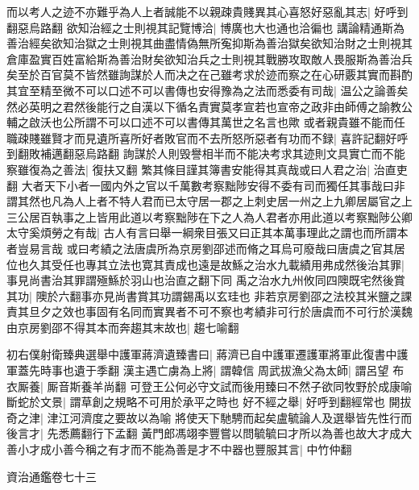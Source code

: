 而以考人之迹不亦難乎為人上者誠能不以親疎貴賤異其心喜怒好惡亂其志|{
	好呼到翻惡烏路翻}
欲知治經之士則視其記覽博洽|{
	博廣也大也通也洽徧也}
講論精通斯為善治經矣欲知治獄之士則視其曲盡情偽無所寃抑斯為善治獄矣欲知治財之士則視其倉庫盈實百姓富給斯為善治財矣欲知治兵之士則視其戰勝攻取敵人畏服斯為善治兵矣至於百官莫不皆然雖詢謀於人而决之在己雖考求於迹而察之在心研覈其實而斟酌其宜至精至微不可以口述不可以書傳也安得豫為之法而悉委有司哉|{
	温公之論善矣然必英明之君然後能行之自漢以下循名責實莫孝宣若也宣帝之政非由師傅之諭教公輔之啟沃也公所謂不可以口述不可以書傳其萬世之名言也歟}
或者親貴雖不能而任職疎賤雖賢才而見遺所喜所好者敗官而不去所怒所惡者有功而不録|{
	喜許記翻好呼到翻敗補邁翻惡烏路翻}
詢謀於人則毁譽相半而不能决考求其迹則文具實亡而不能察雖復為之善法|{
	復扶又翻}
繁其條目謹其簿書安能得其真哉或曰人君之治|{
	治直吏翻}
大者天下小者一國内外之官以千萬數考察黜陟安得不委有司而獨任其事哉曰非謂其然也凡為人上者不特人君而已太守居一郡之上刺史居一州之上九卿居屬官之上三公居百執事之上皆用此道以考察黜陟在下之人為人君者亦用此道以考察黜陟公卿太守奚煩勞之有哉|{
	古人有言曰舉一綱衆目張又曰正其本萬事理此之謂也而所謂本者豈易言哉}
或曰考績之法唐虞所為京房劉邵述而脩之耳烏可廢哉曰唐虞之官其居位也久其受任也專其立法也寛其責成也遠是故鯀之治水九載績用弗成然後治其罪|{
	事見尚書治其罪謂殛鯀於羽山也治直之翻下同}
禹之治水九州攸同四隩既宅然後賞其功|{
	隩於六翻事亦見尚書賞其功謂錫禹以玄珪也}
非若京房劉邵之法校其米鹽之課責其旦夕之效也事固有名同而實異者不可不察也考績非可行於唐虞而不可行於漢魏由京房劉邵不得其本而奔趨其末故也|{
	趨七喻翻}


初右僕射衛臻典選舉中護軍蔣濟遺臻書曰|{
	蔣濟已自中護軍遷護軍將軍此復書中護軍蓋先時事也遺于季翻}
漢主遇亡虜為上將|{
	謂韓信}
周武拔漁父為太師|{
	謂呂望}
布衣厮養|{
	厮音斯養羊尚翻}
可登王公何必守文試而後用臻曰不然子欲同牧野於成康喻斷蛇於文景|{
	謂草創之規略不可用於承平之時也}
好不經之舉|{
	好呼到翻經常也}
開拔奇之津|{
	津江河濟度之要故以為喻}
將使天下馳騁而起矣盧毓論人及選舉皆先性行而後言才|{
	先悉薦翻行下孟翻}
黃門郎馮翊李豐嘗以問毓毓曰才所以為善也故大才成大善小才成小善今稱之有才而不能為善是才不中器也豐服其言|{
	中竹仲翻}


資治通鑑卷七十三
